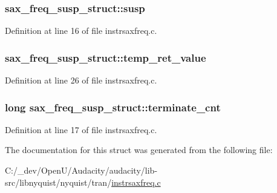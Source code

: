 \subsubsection[{\texorpdfstring{susp}{susp}}]{ sax\+\_\+freq\+\_\+susp\+\_\+struct\+::susp}\hypertarget{structsax__freq__susp__struct_aa0a2b5c67a3d19f61c47b641b2f86d00}{}\label{structsax__freq__susp__struct_aa0a2b5c67a3d19f61c47b641b2f86d00}


Definition at line 16 of file instrsaxfreq.\+c.

\subsubsection[{\texorpdfstring{temp\+\_\+ret\+\_\+value}{temp_ret_value}}]{ sax\+\_\+freq\+\_\+susp\+\_\+struct\+::temp\+\_\+ret\+\_\+value}\hypertarget{structsax__freq__susp__struct_ac5409fab60b473da7946e2e31c4ae572}{}\label{structsax__freq__susp__struct_ac5409fab60b473da7946e2e31c4ae572}


Definition at line 26 of file instrsaxfreq.\+c.

\subsubsection[{\texorpdfstring{terminate\+\_\+cnt}{terminate_cnt}}]{\setlength{\rightskip}{0pt plus 5cm}long sax\+\_\+freq\+\_\+susp\+\_\+struct\+::terminate\+\_\+cnt}\hypertarget{structsax__freq__susp__struct_aab316d2857d0a10d23ffaca3795567fe}{}\label{structsax__freq__susp__struct_aab316d2857d0a10d23ffaca3795567fe}


Definition at line 17 of file instrsaxfreq.\+c.



The documentation for this struct was generated from the following file\+:\begin{DoxyCompactItemize}
\item 
C\+:/\+\_\+dev/\+Open\+U/\+Audacity/audacity/lib-\/src/libnyquist/nyquist/tran/\hyperlink{instrsaxfreq_8c}{instrsaxfreq.\+c}\end{DoxyCompactItemize}
